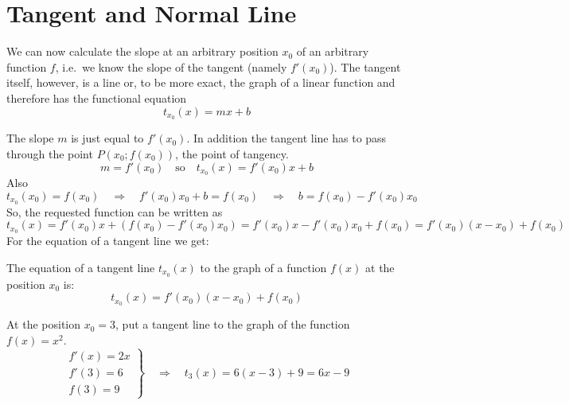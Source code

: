 \documentclass[12pt,eng]{skript_ogg}
\begin{document}
\section{Tangent and Normal Line}
We can now calculate the slope at an arbitrary position $x_0$ of an arbitrary function $f$, i.e.\ we know the slope of the tangent (namely $f'(x_0)$). The tangent itself, however, is a line or, to be more exact, the graph of a linear function and therefore has the functional equation 
\[t_{x_0}(x)=mx+b\]
\begin{center}
\end{center}
The slope $m$ is just equal to $f'(x_0)$. In addition the tangent line has to pass through the point $P(x_0;f(x_0))$, the point of tangency.
\[m=f'(x_0)\quad\mbox{so}\quad t_{x_0}(x)=f'(x_0)x+b\]
Also
\[t_{x_0}(x_0)=f(x_0)\quad\Rightarrow\quad f'(x_0)x_0+b=f(x_0)\quad\Rightarrow\quad b=f(x_0)-f'(x_0)x_0\]
So, the requested function can be written as
\[t_{x_0}(x)=f'(x_0)x+(f(x_0)-f'(x_0)x_0)=f'(x_0)x-f'(x_0)x_0+f(x_0)=f'(x_0)(x-x_0)+f(x_0)\]
For the equation of a tangent line we get:
\begin{satz}
The equation of a tangent line $t_{x_0}(x)$ to the graph of a function $f(x)$ at the position $x_0$ is:
\[t_{x_0}(x)=f'(x_0)(x-x_0)+f(x_0)\]
\end{satz}
\begin{beispiel}
At the position $x_0=3$, put a tangent line to the graph of the function $f(x)=x^2$.
\[\left.\begin{array}{l}f'(x)=2x\\ f'(3)=6\\ f(3)=9
\end{array}\right\}\quad\Rightarrow\quad t_3(x)=6(x-3)+9=6x-9\]
\end{beispiel}
\end{document}
